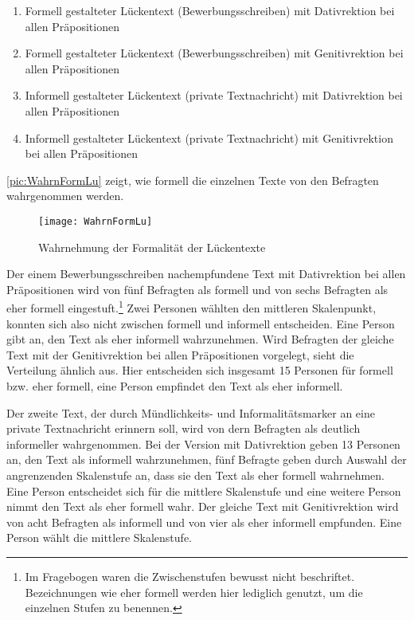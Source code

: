 \begin{enumerate}
\item Formell gestalteter Lückentext (Bewerbungsschreiben) mit Dativrektion bei allen Präpositionen
\item Formell gestalteter Lückentext (Bewerbungsschreiben) mit Genitivrektion bei allen Präpositionen 
\item Informell gestalteter Lückentext (private Textnachricht) mit Dativrektion bei allen Präpositionen
\item Informell gestalteter Lückentext (private Textnachricht) mit Genitivrektion bei allen Präpositionen
\end{enumerate}
\autoref{pic:WahrnFormLu} zeigt, wie formell die einzelnen Texte von den Befragten wahrgenommen werden. 

\begin{figure}
\centering
\texttt{[image: WahrnFormLu]}
\caption{Wahrnehmung der Formalität der Lückentexte}
\label{pic:WahrnFormLu}
\end{figure}

Der einem Bewerbungsschreiben nachempfundene Text mit Dativrektion bei allen Präpositionen wird von fünf Befragten als formell und von sechs Befragten als eher formell eingestuft.\footnote{Im Fragebogen waren die Zwischenstufen bewusst nicht beschriftet. Bezeichnungen wie \glqq eher formell\grqq{} werden hier lediglich genutzt, um die einzelnen Stufen zu benennen.} 
Zwei Personen wählten den mittleren Skalenpunkt, konnten sich also nicht zwischen formell und informell entscheiden. Eine Person gibt an, den Text als eher informell wahrzunehmen. 
Wird Befragten der gleiche Text mit der Genitivrektion bei allen Präpositionen vorgelegt, sieht die Verteilung ähnlich aus. 
Hier entscheiden sich insgesamt 15 Personen für formell bzw. eher formell, eine Person empfindet den Text als eher informell. 

Der zweite Text, der durch Mündlichkeits- und Informalitätsmarker an eine private Textnachricht erinnern soll, wird von dern Befragten als deutlich informeller wahrgenommen. 
Bei der Version mit Dativrektion geben 13 Personen an, den Text als informell wahrzunehmen, fünf Befragte geben durch Auswahl der angrenzenden Skalenstufe an, dass sie den Text als eher formell wahrnehmen. 
Eine Person entscheidet sich für die mittlere Skalenstufe und eine weitere Person nimmt den Text als eher formell wahr. 
Der gleiche Text mit Genitivrektion wird von acht Befragten als informell und von vier als eher informell empfunden.
Eine Person wählt die mittlere Skalenstufe. 

